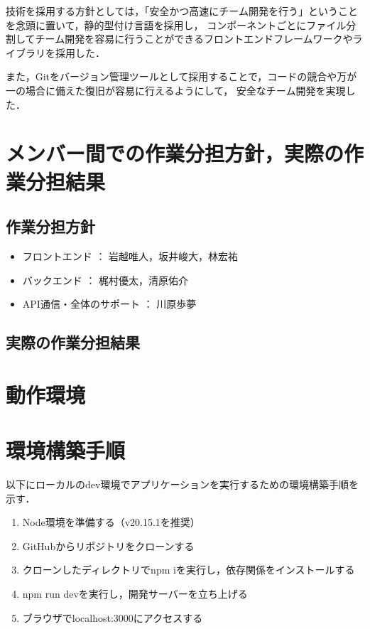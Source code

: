 \documentclass[a4j,titlepage]{jarticle}
\begin{document}
技術を採用する方針としては，「安全かつ高速にチーム開発を行う」ということを念頭に置いて，静的型付け言語を採用し，
コンポーネントごとにファイル分割してチーム開発を容易に行うことができるフロントエンドフレームワークやライブラリを採用した．

また，Gitをバージョン管理ツールとして採用することで，コードの競合や万が一の場合に備えた復旧が容易に行えるようにして，
安全なチーム開発を実現した．

\section{メンバー間での作業分担方針，実際の作業分担結果}

\subsection{作業分担方針}
\begin{itemize}
\item フロントエンド ： 岩越唯人，坂井峻大，林宏祐
\item バックエンド ： 梶村優太，清原佑介
\item API通信・全体のサポート ： 川原歩夢
\end{itemize}

\subsection{実際の作業分担結果}


\section{動作環境}

\section{環境構築手順}
以下にローカルのdev環境でアプリケーションを実行するための環境構築手順を示す．
\begin{enumerate}
\item Node環境を準備する（v20.15.1を推奨）
\item GitHubからリポジトリをクローンする
\item クローンしたディレクトリでnpm iを実行し，依存関係をインストールする
\item npm run devを実行し，開発サーバーを立ち上げる
\item ブラウザでlocalhost:3000にアクセスする
\end{enumerate}
\end{document}
